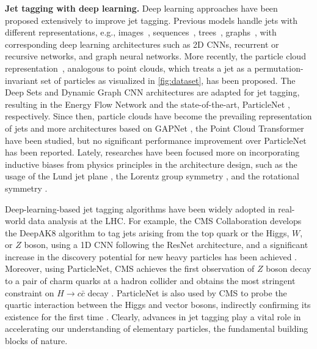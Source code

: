 \documentclass[nohyperref]{article}
\theoremstyle{plain}
\theoremstyle{definition}
\theoremstyle{remark}
\newcommand{\hcc}{\ensuremath{H\to c \bar{c}}\xspace}
\begin{document}
\textbf{Jet tagging with deep learning.}
Deep learning approaches have been proposed extensively to improve jet tagging. Previous models handle jets with different representations, e.g., images~\cite{deOliveira:2015xxd}, sequences~\cite{Guest:2016iqz}, trees~\cite{Louppe:2017ipp}, graphs~\cite{henrionneural}, with corresponding deep learning architectures such as 2D CNNs, recurrent or recursive networks, and graph neural networks. More recently, the particle cloud representation~\cite{Komiske:2018cqr,Qu:2019gqs}, analogous to point clouds, which treats a jet as a permutation-invariant set of particles as visualized in \cref{fig:dataset}, has been proposed. The Deep Sets \cite{NIPS2017_f22e4747} and Dynamic Graph CNN \cite{dgcnn} architectures are adapted for jet tagging, resulting in the Energy Flow Network \cite{Komiske:2018cqr} and the state-of-the-art, ParticleNet \cite{Qu:2019gqs}, respectively. Since then, particle clouds have become the prevailing representation of jets and more architectures based on GAPNet \cite{chen2019gapnet,Mikuni:2020wpr}, the Point Cloud Transformer \cite{guoPCTPointCloud2021,Mikuni:2021pou} have been studied, but no significant performance improvement over ParticleNet has been reported. Lately, researches have been focused more on incorporating inductive biases from physics principles in the architecture design, such as the usage of the Lund jet plane \cite{Dreyer:2018nbf,Dreyer:2020brq,Dreyer:2021hhr,Dreyer:2022yom}, the Lorentz group symmetry \cite{bogatskiy20a,Gong:2022lye}, and the rotational symmetry \cite{Shimmin:2021pkm,Dillon:2021gag}.

Deep-learning-based jet tagging algorithms have been widely adopted in real-world data analysis at the LHC. For example, the CMS Collaboration develops the DeepAK8 \cite{CMS:2020poo} algorithm to tag jets arising from the top quark or the Higgs, $W$, or $Z$ boson, using a 1D CNN following the ResNet \cite{heDeepResidualLearning2015} architecture, and a significant increase in the discovery potential for new heavy particles has been achieved \cite{CMS:2021beq,CMS:2022lqh}. Moreover, using ParticleNet, CMS achieves the first observation of $Z$ boson decay to a pair of charm quarks at a hadron collider and obtains the most stringent constraint on \hcc decay \cite{CMS:2022psv}. ParticleNet is also used by CMS to probe the quartic interaction between the Higgs and vector bosons, indirectly confirming its existence for the first time \cite{CMS:2022nmn}. Clearly, advances in jet tagging play a vital role in accelerating our understanding of elementary particles, the fundamental building blocks of nature.
\end{document}
